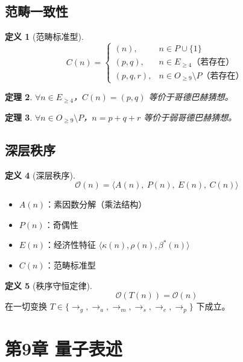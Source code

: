 \documentclass[12pt]{article}
\newtheorem{theorem}{定理}[section]
\theoremstyle{definition}
\newtheorem{definition}[theorem]{定义}
\begin{document}
\subsection{范畴一致性}

\begin{definition}[范畴标准型]
\[
C(n) =
\begin{cases}
(n), & n \in P \cup \{1\} \\
(p,q), & n \in E_{\geq 4} \text{（若存在）} \\
(p,q,r), & n \in O_{\geq 9} \setminus P \text{（若存在）}
\end{cases}
\]
\end{definition}

\begin{theorem}
\(\forall n \in E_{\geq 4}\)，\(C(n) = (p,q)\) 等价于哥德巴赫猜想。
\end{theorem}

\begin{theorem}
\(\forall n \in O_{\geq 9} \setminus P\)，\(n = p+q+r\) 等价于弱哥德巴赫猜想。
\end{theorem}

\subsection{深层秩序}

\begin{definition}[深层秩序]
\[
\mathcal{O}(n) = \langle A(n),\ P(n),\ E(n),\ C(n) \rangle
\]
\begin{itemize}
    \item \(A(n)\)：素因数分解（乘法结构）
    \item \(P(n)\)：奇偶性
    \item \(E(n)\)：经济性特征 \(\langle \kappa(n), \rho(n), \beta^*(n) \rangle\)
    \item \(C(n)\)：范畴标准型
\end{itemize}
\end{definition}

\begin{definition}[秩序守恒定律]
\[
\mathcal{O}(T(n)) = \mathcal{O}(n)
\]
在一切变换 \(T \in \{\rightarrow_g, \rightarrow_a, \rightarrow_m, \rightarrow_s, \rightarrow_e, \rightarrow_p\}\) 下成立。
\end{definition}

\newpage


\section{第9章 量子表述}
\end{document}
